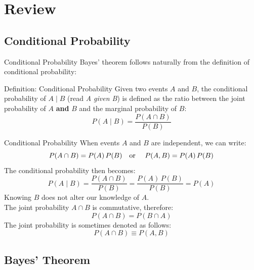 \section[Review]{Review}

\subsection{Conditional Probability}

\begin{frame}{Conditional Probability}
	Bayes' theorem follows naturally from the definition of conditional probability:
	\begin{block}{Definition: Conditional Probability}
		Given two events $A$ and $B$, the conditional probability of $A \mid B$ (read \textit{A given B}) is defined as the ratio between the joint probability of $A$ \textbf{and} $B$ and the marginal probability of $B$:
		\begin{equation}
			P(A \mid B) = \displaystyle \frac{P(A \cap B)}{P(B)}
			\nonumber
		\end{equation}
	\end{block}
\end{frame}

\begin{frame}{Conditional Probability}
	When events $A$ and $B$ are independent, we can write:
	\begin{equation}
		P(A \cap B) = P(A) \, P(B)
		\text{\quad or \quad} P(A, B) = P(A) \, P(B)
		\nonumber
	\end{equation}
	\pause
	The conditional probability then becomes:
	\begin{equation}
		P(A \mid B) = \displaystyle \frac{P(A \cap B)}{P(B)} = \displaystyle \frac{P(A) \, P(B)}{P(B)} = P(A)
		\nonumber
	\end{equation}
	Knowing $B$ does not alter our knowledge of $A$. \\
	\pause
	\vspace{0.3cm}
	The joint probability $A \cap B$ is commutative, therefore:
	\begin{equation}
		P(A \cap B) = P(B \cap A)
		\nonumber
	\end{equation}
	\pause
	The joint probability is sometimes denoted as follows:
	\begin{equation}
		P(A \cap B) \equiv P(A, B)
		\nonumber
	\end{equation}
\end{frame}

\subsection{Bayes' Theorem}

